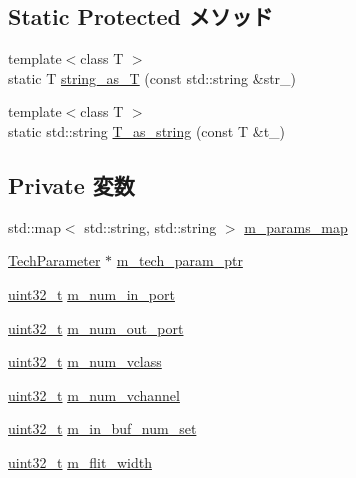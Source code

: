 \subsection*{Static Protected メソッド}
\begin{DoxyCompactItemize}
\item 
{\footnotesize template$<$class T $>$ }\\static T \hyperlink{classOrionConfig_a081922371e67d6407856e275638a6c47}{string\_\-as\_\-T} (const std::string \&str\_\-)
\item 
{\footnotesize template$<$class T $>$ }\\static std::string \hyperlink{classOrionConfig_aaf412122e8782f01e0e93132bce00b17}{T\_\-as\_\-string} (const T \&t\_\-)
\end{DoxyCompactItemize}
\subsection*{Private 変数}
\begin{DoxyCompactItemize}
\item 
std::map$<$ std::string, std::string $>$ \hyperlink{classOrionConfig_a11cd5a281c33309a753de54a6112959e}{m\_\-params\_\-map}
\item 
\hyperlink{classTechParameter}{TechParameter} $\ast$ \hyperlink{classOrionConfig_a8694e884458cc885a211e37eb847221e}{m\_\-tech\_\-param\_\-ptr}
\item 
\hyperlink{Type_8hh_a435d1572bf3f880d55459d9805097f62}{uint32\_\-t} \hyperlink{classOrionConfig_aac6d2a4ff86073212e8ef4ac53742ddc}{m\_\-num\_\-in\_\-port}
\item 
\hyperlink{Type_8hh_a435d1572bf3f880d55459d9805097f62}{uint32\_\-t} \hyperlink{classOrionConfig_a56cb909217f28866d2a08a40adb3ef08}{m\_\-num\_\-out\_\-port}
\item 
\hyperlink{Type_8hh_a435d1572bf3f880d55459d9805097f62}{uint32\_\-t} \hyperlink{classOrionConfig_ac6cc31c075b331538b0aaa0bb593b2e3}{m\_\-num\_\-vclass}
\item 
\hyperlink{Type_8hh_a435d1572bf3f880d55459d9805097f62}{uint32\_\-t} \hyperlink{classOrionConfig_ac0b1d8a0523e7c7ce285c7917a764c9f}{m\_\-num\_\-vchannel}
\item 
\hyperlink{Type_8hh_a435d1572bf3f880d55459d9805097f62}{uint32\_\-t} \hyperlink{classOrionConfig_a927e63d117d6b6e13c28ae38771d3e93}{m\_\-in\_\-buf\_\-num\_\-set}
\item 
\hyperlink{Type_8hh_a435d1572bf3f880d55459d9805097f62}{uint32\_\-t} \hyperlink{classOrionConfig_a5c6cdf07d59103637f21c8a460ba7e2e}{m\_\-flit\_\-width}
\end{DoxyCompactItemize}

